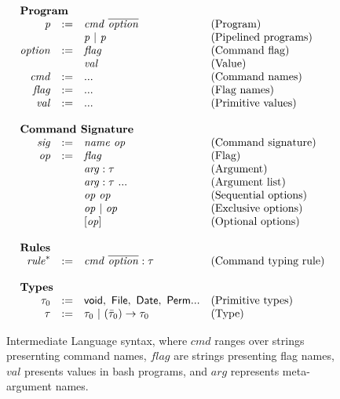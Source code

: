 \begin{figure}[ht]
\[
\begin{array}{rlll}
\multicolumn{3}{l}{\textbf{Program}}\\
\mathit{p} & :=  & \mathit{cmd}~\overline{\mathit{option}} & \textrm{(Program)}\\
    &  & \mathit{p} ~|~ \mathit{p} & \textrm{(Pipelined programs)} \\
\mathit{option} & := & \mathit{flag} & \textrm{(Command flag)}\\
                &    & \mathit{val} & \textrm{(Value)}\\
\mathit{cmd} & := & ... & \textrm{(Command names)}\\
\mathit{flag} & := & ... & \textrm{(Flag names)}\\
\mathit{val} & := & ...  & \textrm{(Primitive values)}\\
~\\
\multicolumn{3}{l}{\textbf{Command Signature}}\\
\mathit{sig} & := & \mathit{name}~\mathit{op} & \textrm{(Command signature)}\\
\mathit{op} &:= & \mathit{flag} & \textrm{(Flag)}\\
                &   & \mathit{arg}:\tau & \textrm{(Argument)}\\
                &   & \mathit{arg}:\tau~...& \textrm{(Argument list)}\\
                &   & \mathit{op}~\mathit{op} & \textrm{(Sequential options)}\\
                &   & \mathit{op}~|~\mathit{op} & \textrm{(Exclusive options)}\\
                &   & [ \mathit{op} ] & \textrm{(Optional options)}\\
~\\
\multicolumn{3}{l}{\textbf{Rules}}\\
\mathit{rule}^{*} &:=& \mathit{cmd}~\overline{\mathit{option}} : \tau & \textrm{(Command typing rule)}\\
~\\
\multicolumn{3}{l}{\textbf{Types}}\\
\tau_0 & := & \mathsf{void},~ \mathsf{File},~ \mathsf{Date},~\mathsf{Perm} ...& \textrm{(Primitive types)}\\
\tau & := & \tau_0 ~|~ (\bar{\tau}_0)\rightarrow \tau_0 & \textrm{(Type)}
\end{array}
\]
\caption{Intermediate Language syntax, where $\mathit{cmd}$ ranges over strings presernting command names, $\mathit{flag}$ are strings presenting flag names, $\mathit{val}$ presents values in bash programs, and $\mathit{arg}$ represents meta-argument names.}
\label{fig:lang}
\end{figure}


